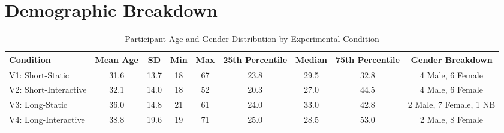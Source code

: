 \section{Demographic Breakdown}
\label{sec:apdx:demo}

\begin{table}[h!]
\centering
\caption{Participant Age and Gender Distribution by Experimental Condition}
\label{tab:age_gender_distribution}
\begin{tabular}{lcccccccc}
\hline
\textbf{Condition} & \textbf{Mean Age} & \textbf{SD} & \textbf{Min} & \textbf{Max} & \textbf{25th Percentile} & \textbf{Median} & \textbf{75th Percentile} & \textbf{Gender Breakdown} \\
\hline
V1: Short-Static      & 31.6  & 13.7 & 18 & 67 & 23.8 & 29.5 & 32.8 & 4 Male, 6 Female \\
V2: Short-Interactive & 32.1  & 14.0 & 18 & 52 & 20.3 & 27.0 & 44.5 & 4 Male, 6 Female \\
V3: Long-Static       & 36.0  & 14.8 & 21 & 61 & 24.0 & 33.0 & 42.8 & 2 Male, 7 Female, 1 NB \\
V4: Long-Interactive  & 38.8  & 19.6 & 19 & 71 & 25.0 & 28.5 & 53.0 & 2 Male, 8 Female \\
\hline
\end{tabular}
\end{table}

